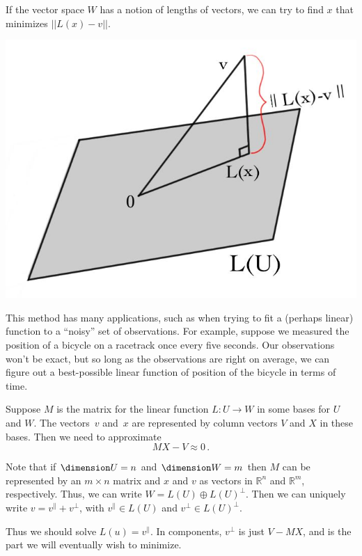 If the vector space $W$ has a notion of lengths of vectors, we can try to find $x$ that minimizes $||L(x)-v||$.
\begin{center}
\includegraphics[alt={A plane L(U) and a vector v not in the plane.  The point L(x) makes a right angle to L(x)-v.},scale=.24]{minimize.jpg}
\end{center} 
This method has many applications, such as when trying to fit a (perhaps linear) function to a ``noisy'' set of observations.  For example, suppose we measured the position of a bicycle on a racetrack once every five seconds.  Our observations won't be exact, but so long as the observations are right on average, we can figure out a best-possible linear function of position of the bicycle in terms of time.

Suppose $M$ is the matrix for the linear function $L:U \to W$ in some bases for $U$ and $W$. The vectors~$v$ and~$x$ are represented by column vectors $V$ and $X$ in these bases.  Then we need to approximate
\[
MX-V\approx 0\, .
\]

Note that if $\dimension U=n$ and $\dimension W=m$ then $M$ can be represented by an $m\times n$ matrix and $x$ and $v$ as vectors in $\mathbb{R}^n$ and $\mathbb{R}^m$, respectively. Thus, we can write $W=L(U)\oplus L(U)^\perp$.  Then we can uniquely write $v=v^\parallel + v^\perp$, with $v^\parallel \in L(U)$ and $v^\perp \in L(U)^\perp$.  



Thus we should solve $L(u)=v^\parallel$.  In components, $v^\perp$ is just $V-MX$, and is the part we will eventually wish to minimize.  

